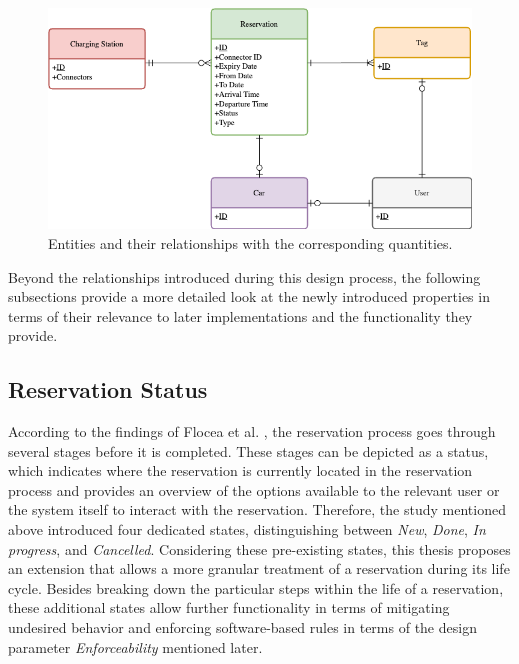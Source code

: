 \begin{figure}[h]
    \centering
    \includegraphics[scale=0.4]{resources/images/main/5_design/Entities.png}
    \caption{Entities and their relationships with the corresponding quantities.}
    \label{fig:entity-relationship-diagram}
\end{figure}

\noindent Beyond the relationships introduced during this design process, the following subsections provide a more detailed look at the newly introduced properties in terms of their relevance to later implementations and the functionality they provide.

\subsection{Reservation Status}
\label{ch:Design:sec:Reservation:ssec:Reservation Status}

According to the findings of Flocea et al. \cite{flocea_electric_2022}, the reservation process goes through several stages before it is completed. These stages can be depicted as a status, which indicates where the reservation is currently located in the reservation process and provides an overview of the options available to the relevant user or the system itself to interact with the reservation.
Therefore, the study mentioned above introduced four dedicated states, distinguishing between \textit{New}, \textit{Done}, \textit{In progress}, and \textit{Cancelled}.
Considering these pre-existing states, this thesis proposes an extension that allows a more granular treatment of a reservation during its life cycle. Besides breaking down the particular steps within the life of a reservation, these additional states allow further functionality in terms of mitigating undesired behavior and enforcing software-based rules in terms of the design parameter \textit{Enforceability} mentioned later.

